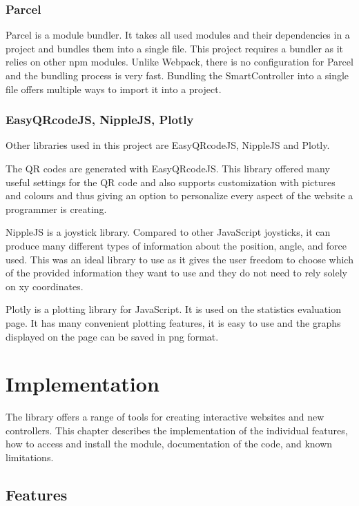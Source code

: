 \documentclass{l4proj}
\begin{document}
\subsection{Parcel}
Parcel is a module bundler. It takes all used modules and their dependencies in a project and bundles them into a single file. This project requires a bundler as it relies on other npm modules. Unlike Webpack, there is no configuration for Parcel and the bundling process is very fast. Bundling the SmartController into a single file offers multiple ways to import it into a project.

\subsection{EasyQRcodeJS, NippleJS, Plotly}
Other libraries used in this project are EasyQRcodeJS, NippleJS and Plotly. \par 
The QR codes are generated with EasyQRcodeJS. This library offered many useful settings for the QR code and also supports customization with pictures and colours and thus giving an option to personalize every aspect of the website a programmer is creating.  \par
NippleJS is a joystick library. Compared to other JavaScript joysticks, it can produce many different types of information about the position, angle, and force used. This was an ideal library to use as it gives the user freedom to choose which of the provided information they want to use and they do not need to rely solely on xy coordinates. \par
Plotly is a plotting library for JavaScript. It is used on the statistics evaluation page. It has many convenient plotting features, it is easy to use and the graphs displayed on the page can be saved in png format.


\chapter{Implementation}
The library offers a range of tools for creating interactive websites and new controllers. This chapter describes the implementation of the individual features, how to access and install the module, documentation of the code, and known limitations.

\section{Features}
\end{document}

